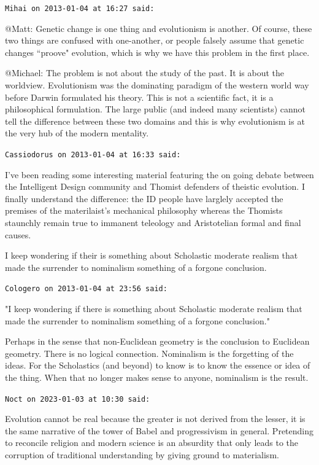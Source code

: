\begin{footnotesize}
\begin{sffamily}
\hfill

\texttt{Mihai on 2013-01-04 at 16:27 said: }

@Matt: Genetic change is one thing and evolutionism is another. Of course, these two things are confused with one-another, or people falsely assume that genetic changes ``proove" evolution, which is why we have this problem in the first place.

@Michael: The problem is not about the study of the past. It is about the worldview. Evolutionism was the dominating paradigm of the western world way before Darwin formulated his theory. This is not a scientific fact, it is a philosophical formulation. The large public (and indeed many scientists) cannot tell the difference between these two domains and this is why evolutionism is at the very hub of the modern mentality.


\hfill

\texttt{Cassiodorus on 2013-01-04 at 16:33 said: }

I've been reading some interesting material featuring the on going debate between the Intelligent Design community and Thomist defenders of theistic evolution. I finally understand the difference: the ID people have larglely accepted the premises of the materilaist's mechanical philosophy whereas the Thomists staunchly remain true to immanent teleology and Aristotelian formal and final causes.

I keep wondering if their is something about Scholastic moderate realism that made the surrender to nominalism something of a forgone conclusion.


\hfill

\texttt{Cologero on 2013-01-04 at 23:56 said: }

"I keep wondering if there is something about Scholastic moderate realism that made the surrender to nominalism something of a forgone conclusion."

Perhaps in the sense that non-Euclidean geometry is the conclusion to Euclidean geometry. There is no logical connection. Nominalism is the forgetting of the ideas. For the Scholastics (and beyond) to know is to know the essence or idea of the thing. When that no longer makes sense to anyone, nominalism is the result.


\hfill

\texttt{Noct on 2023-01-03 at 10:30 said: }

Evolution cannot be real because the greater is not derived from the lesser, it is the same narrative of the tower of Babel and progressivism in general. Pretending to reconcile religion and modern science is an absurdity that only leads to the corruption of traditional understanding by giving ground to materialism.


\end{sffamily}
\end{footnotesize}
